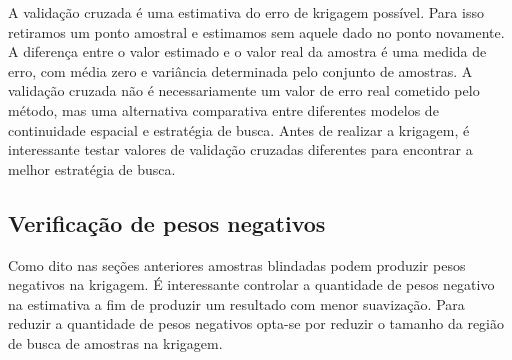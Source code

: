 A validação cruzada é uma estimativa do erro de krigagem possível. Para isso retiramos um ponto amostral e estimamos sem aquele dado no ponto novamente. A diferença entre o valor estimado e o valor real da amostra é uma medida de erro, com média zero e variância determinada pelo conjunto de amostras. A validação cruzada não é necessariamente um valor de erro real cometido pelo método, mas uma alternativa comparativa entre diferentes modelos de continuidade espacial e estratégia de busca. Antes de realizar a krigagem, é interessante testar valores de validação cruzadas diferentes para encontrar a melhor estratégia de busca. 

\subsection{Verificação de pesos negativos}

Como dito nas seções anteriores amostras blindadas podem produzir pesos negativos na krigagem. É interessante controlar a quantidade de pesos negativo na estimativa a fim de produzir um resultado com menor suavização. Para reduzir a quantidade de pesos negativos opta-se por reduzir o tamanho da região de busca de amostras na krigagem. 

